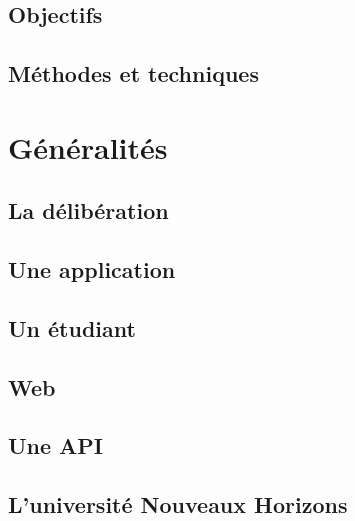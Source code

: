 \documentclass[12pt, a4paper]{report}
\begin{document}
    \section{Objectifs}\label{sec:objectifs}
    

    \section{Méthodes et techniques}\label{sec:methode}
    

    \chapter{Généralités}\label{cha:generalites}

    \section{La délibération}\label{subsec:deliberation}
    

    \section{Une application}\label{subsec:application}
    

    \section{Un étudiant}\label{subsec:etudiants}
    

    \section{Web}\label{subsec:web}
    

    \section{Une API}\label{subsec:api}
    

    \section{L'université Nouveaux Horizons}\label{subsec:unh}
    
\end{document}
